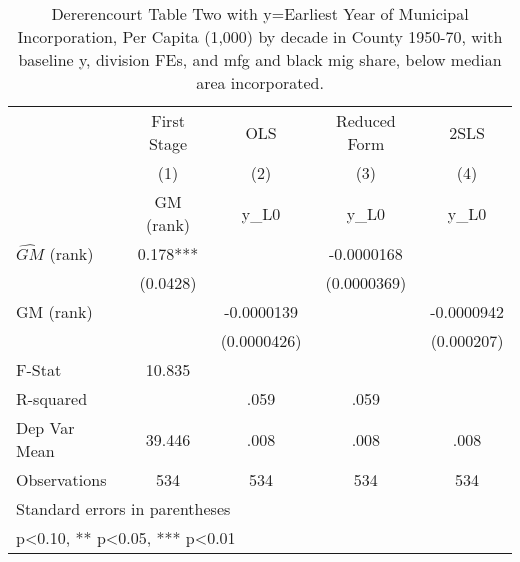 \begin{table}[htbp]\centering
\def\sym#1{\ifmmode^{#1}\else\(^{#1}\)\fi}
\caption{Dererencourt Table Two with y=Earliest Year of Municipal Incorporation, Per Capita (1,000) by decade in County 1950-70, with baseline y, division FEs, and mfg and black mig share, below median area incorporated.}
\begin{tabular}{l*{4}{c}}
\toprule
                    & First Stage   &         OLS   &Reduced Form   &        2SLS   \\
                    &\multicolumn{1}{c}{(1)}&\multicolumn{1}{c}{(2)}&\multicolumn{1}{c}{(3)}&\multicolumn{1}{c}{(4)}\\
                    &\multicolumn{1}{c}{GM  (rank)}&\multicolumn{1}{c}{y\_L0}&\multicolumn{1}{c}{y\_L0}&\multicolumn{1}{c}{y\_L0}\\
\midrule
$\hat{GM}$ (rank)   &       0.178***&               &  -0.0000168   &               \\
                    &    (0.0428)   &               & (0.0000369)   &               \\
\addlinespace
GM  (rank)          &               &  -0.0000139   &               &  -0.0000942   \\
                    &               & (0.0000426)   &               &  (0.000207)   \\
\midrule
F-Stat              &      10.835   &               &               &               \\
R-squared           &               &        .059   &        .059   &               \\
Dep Var Mean        &      39.446   &        .008   &        .008   &        .008   \\
Observations        &         534   &         534   &         534   &         534   \\
\bottomrule
\multicolumn{5}{l}{\footnotesize Standard errors in parentheses}\\
\multicolumn{5}{l}{\footnotesize * p<0.10, ** p<0.05, *** p<0.01}\\
\end{tabular}
\end{table}
